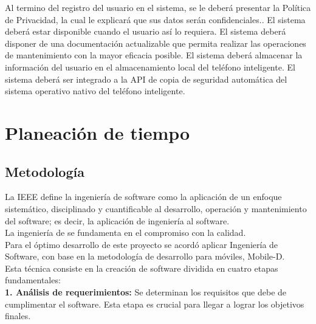 \documentclass[10pt]{article}
\begin{document}
\begin{cdtRequirementsNF}[version=1.0, author=Rodolfo, status=En espera de aprobación del asesor, revisor=Ulises]
	{Al termino del registro del usuario en el sistema, se le deberá presentar la Política de Privacidad, la cual le explicará que sus datos serán confidenciales..}
	{El sistema deberá estar disponible cuando el usuario así lo requiera.}
	{El sistema deberá disponer de una documentación actualizable que permita realizar las operaciones de mantenimiento con la mayor eficacia posible.}
	{El sistema deberá almacenar la información del usuario en el almacenamiento local del teléfono inteligente.}
	{El sistema deberá ser integrado a la API de copia de seguridad automática del sistema operativo nativo del teléfono inteligente.}
\end{cdtRequirementsNF}

\newpage 
\section{Planeación de tiempo}

\subsection{Metodología}
La IEEE define la ingeniería de software como la aplicación de un enfoque sistemático, disciplinado y cuantificable al desarrollo, operación y mantenimiento del software; es decir, la aplicación de ingeniería al software.\\ 

La ingeniería de se fundamenta en el compromiso con la calidad.\\

Para el óptimo desarrollo de este proyecto se acordó aplicar Ingeniería de Software, con base en la metodología de desarrollo para móviles, Mobile-D.\\

Esta técnica consiste en la creación de software dividida en cuatro etapas fundamentales:\\

\textbf{1. Análisis de requerimientos:} Se determinan los requisitos que debe de cumplimentar el software. Esta etapa es crucial para llegar a lograr los objetivos finales.\\
\end{document}
